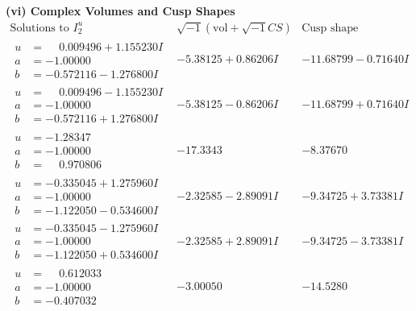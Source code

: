 \documentclass[1p]{elsarticle_modified}
\theoremstyle{definition}
\newcommand{\I}{\sqrt{-1}}
\begin{document}
\newpage\flushleft \textbf{(vi) Complex Volumes and Cusp Shapes}
$$\begin{array}{c|c|c}  
\text{Solutions to }I^u_{2}& \I (\text{vol} + \sqrt{-1}CS) & \text{Cusp shape}\\
 \hline 
\begin{aligned}
u &= \phantom{-}0.009496 + 1.155230 I \\
a &= -1.00000\phantom{ +0.000000I} \\
b &= -0.572116 - 1.276800 I\end{aligned}
 & -5.38125 + 0.86206 I & -11.68799 - 0.71640 I \\ \hline\begin{aligned}
u &= \phantom{-}0.009496 - 1.155230 I \\
a &= -1.00000\phantom{ +0.000000I} \\
b &= -0.572116 + 1.276800 I\end{aligned}
 & -5.38125 - 0.86206 I & -11.68799 + 0.71640 I \\ \hline\begin{aligned}
u &= -1.28347\phantom{ +0.000000I} \\
a &= -1.00000\phantom{ +0.000000I} \\
b &= \phantom{-}0.970806\phantom{ +0.000000I}\end{aligned}
 & -17.3343\phantom{ +0.000000I} & -8.37670\phantom{ +0.000000I} \\ \hline\begin{aligned}
u &= -0.335045 + 1.275960 I \\
a &= -1.00000\phantom{ +0.000000I} \\
b &= -1.122050 - 0.534600 I\end{aligned}
 & -2.32585 - 2.89091 I & -9.34725 + 3.73381 I \\ \hline\begin{aligned}
u &= -0.335045 - 1.275960 I \\
a &= -1.00000\phantom{ +0.000000I} \\
b &= -1.122050 + 0.534600 I\end{aligned}
 & -2.32585 + 2.89091 I & -9.34725 - 3.73381 I \\ \hline\begin{aligned}
u &= \phantom{-}0.612033\phantom{ +0.000000I} \\
a &= -1.00000\phantom{ +0.000000I} \\
b &= -0.407032\phantom{ +0.000000I}\end{aligned}
 & -3.00050\phantom{ +0.000000I} & -14.5280\phantom{ +0.000000I} \\ \hline\begin{aligned}

\end{aligned}
\end{array}$$
\end{document}
